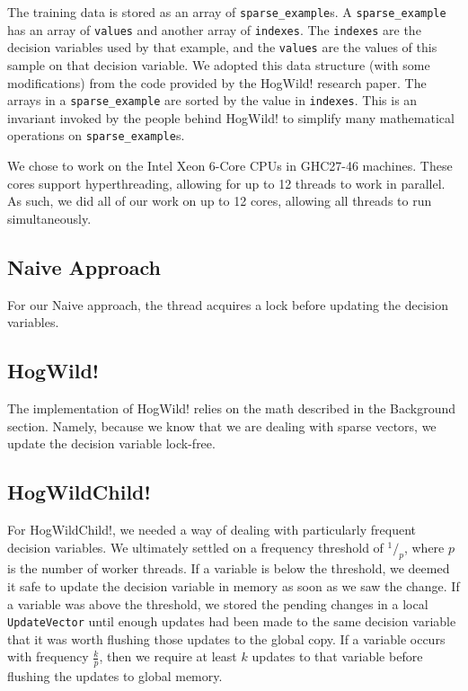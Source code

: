 \documentclass{article}
\newcommand*\rfrac[2]{{}^{#1}\!/_{#2}}
\begin{document}
The training data is stored as an array of \texttt{sparse\_example}s.
A \texttt{sparse\_example} has an array of \texttt{values} and 
another array of \texttt{indexes}.
The \texttt{indexes} are the decision variables used by that example,
and the \texttt{values} are the values of this sample on that decision
variable.
We adopted this data structure (with some modifications) from the code
provided by the HogWild! research paper.
The arrays in a \texttt{sparse\_example} are sorted by the value in
\texttt{indexes}.
This is an invariant invoked by the people behind HogWild! to simplify
many mathematical operations on \texttt{sparse\_example}s.

We chose to work on the Intel Xeon 6-Core CPUs in GHC27-46 machines.
These cores support hyperthreading, allowing for up to 12 threads to work
in parallel.
As such, we did all of our work on up to 12 cores, allowing all threads to
run simultaneously.

\subsection{Naive Approach}

For our Naive approach,
the thread acquires a lock before updating the decision variables.

\subsection{HogWild!}

The implementation of HogWild! relies on the math described in the
Background section.
Namely, because we know that we are dealing with sparse vectors,
we update the decision variable lock-free.

\subsection{HogWildChild!}

For HogWildChild!, we needed a way of dealing with particularly frequent
decision variables.
We ultimately settled on a frequency threshold of $\rfrac 1 p$, where
$p$ is the number of worker threads.
If a variable is below the threshold,
we deemed it safe to update the decision variable in memory as soon as
we saw the change.
If a variable was above the threshold, we stored the pending changes in
a local \texttt{UpdateVector} until enough updates had been made to the
same decision variable that it was worth flushing those updates to
the global copy.
If a variable occurs with frequency $\frac k p$, then we require at least
$k$ updates to that variable before flushing the updates to global memory.
\end{document}

